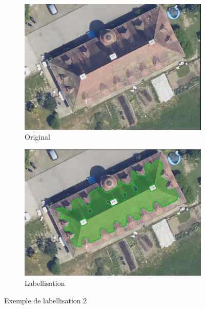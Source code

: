 \begin{figure}[H]
    \centering
    \begin{subfigure}[b]{0.49\textwidth}
        \centering
        \includegraphics[width=\textwidth]{02-main/figures/ch3/ch3_labellisation_02_exemples_02_lucarne1.png}
        \caption{Original}
        \label{fig:ch3_labellisation_02_exemples_02_lucarne1}
    \end{subfigure}
    \hfill
    \begin{subfigure}[b]{0.49\textwidth}
        \centering
        \includegraphics[width=\textwidth]{02-main/figures/ch3/ch3_labellisation_02_exemples_02_lucarne2.png}
        \caption{Labellisation}
        \label{fig:ch3_labellisation_02_exemples_02_lucarne2}
    \end{subfigure}
    \caption{Exemple de labellisation 2}
    \label{fig:labellisation_lucarne_exemple}
\end{figure}

